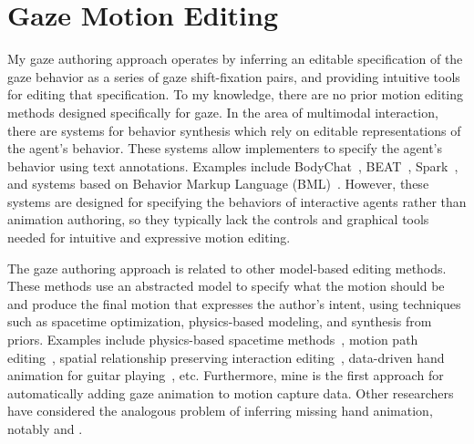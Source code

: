 \section{Gaze Motion Editing}

My gaze authoring approach operates by inferring an editable specification of the gaze behavior as a series of gaze shift-fixation pairs, and providing intuitive tools for editing that specification. To my knowledge, there are no prior motion editing methods designed specifically for gaze. In the area of multimodal interaction, there are systems for behavior synthesis which rely on editable representations of the agent's behavior. These systems allow implementers to specify the agent's behavior using text annotations. Examples include BodyChat~\cite{vilhjalmsson1998bodychat}, BEAT~\cite{cassell1999fully}, Spark~\cite{vilhjalmsson2004animating}, and systems based on Behavior Markup Language (BML)~\cite{vilhjalmsson2007bml}. However, these systems are designed for specifying the behaviors of interactive agents rather than animation authoring, so they typically lack the controls and graphical tools needed for intuitive and expressive motion editing.

The gaze authoring approach is related to other model-based editing methods. These methods use an abstracted model to specify what the motion should be and produce the final motion that expresses the author's intent, using techniques such as spacetime optimization, physics-based modeling, and synthesis from priors. Examples include physics-based spacetime methods~\cite{popovic99physically}, motion path editing~\cite{gleicher2001path}, spatial relationship preserving interaction editing~\cite{ho2010spatial}, data-driven hand animation for guitar playing~\cite{elkoura2003handrix}, etc. Furthermore, mine is the first approach for automatically adding gaze animation to motion capture data. Other researchers have considered the analogous problem of inferring missing hand animation, notably \citet{jorg2012finger} and \citet{ye2012hand}.
